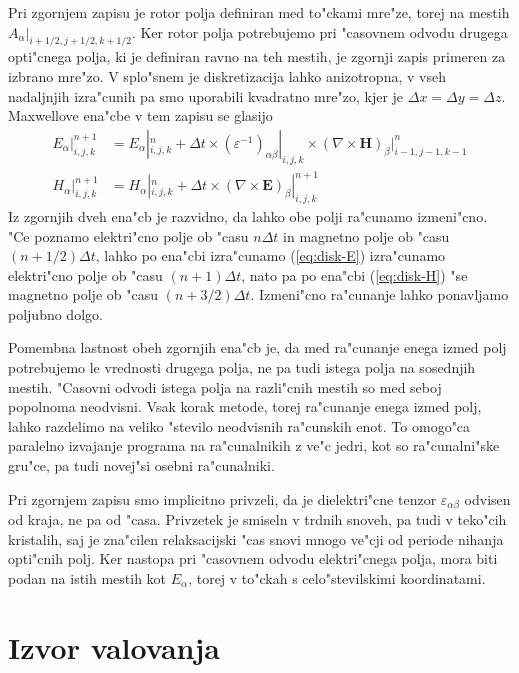 \documentclass[12pt,twoside,openright,final,a4paper]{report}
\renewcommand{\vec}{\mathbf}
\begin{document}
Pri zgornjem zapisu je rotor polja definiran med to"ckami mre"ze, torej na mestih $A_\alpha|_{i+1/2,j+1/2,k+1/2}$. 
Ker rotor polja potrebujemo pri "casovnem odvodu drugega opti"cnega polja, ki je definiran ravno na teh mestih, je zgornji zapis primeren za izbrano mre"zo. 
V splo"snem je diskretizacija lahko anizotropna, v vseh nadaljnjih izra"cunih pa smo uporabili kvadratno mre"zo, kjer je $\Delta x = \Delta y = \Delta z$. 
Maxwellove ena"cbe v tem zapisu se glasijo
\begin{align}
 E_\alpha|_{i,j,k}^{n+1} &= E_\alpha|_{i,j,k}^n + \Delta t \times (\varepsilon^{-1})_{\alpha\beta}|_{i,j,k} \times (\nabla\times \vec H)_\beta|_{i-1,j-1,k-1}^{n} \label{eq:disk-E}\\
 H_\alpha|_{i,j,k}^{n+1} &= H_\alpha|_{i,j,k}^n + \Delta t \times (\nabla\times \vec E)_\beta|_{i,j,k}^{n+1} \label{eq:disk-H}
\end{align}
Iz zgornjih dveh ena"cb je razvidno, da lahko obe polji ra"cunamo izmeni"cno. 
"Ce poznamo elektri"cno polje ob "casu $n\Delta t$ in magnetno polje ob "casu $(n+1/2)\Delta t$, lahko po ena"cbi izra"cunamo (\ref{eq:disk-E}) izra"cunamo elektri"cno polje ob "casu $(n+1)\Delta t$, nato pa po ena"cbi (\ref{eq:disk-H}) "se magnetno polje ob "casu $(n+3/2)\Delta t$. Izmeni"cno ra"cunanje lahko ponavljamo poljubno dolgo. 

Pomembna lastnost obeh zgornjih ena"cb je, da med ra"cunanje enega izmed polj potrebujemo le vrednosti drugega polja, ne pa tudi istega polja na sosednjih mestih. 
"Casovni odvodi istega polja na razli"cnih mestih so med seboj popolnoma neodvisni. 
Vsak korak metode, torej ra"cunanje enega izmed polj, lahko razdelimo na veliko "stevilo neodvisnih ra"cunskih enot. 
To omogo"ca paralelno izvajanje programa na ra"cunalnikih z ve"c jedri, kot so ra"cunalni"ske gru"ce, pa tudi novej"si osebni ra"cunalniki. 

Pri zgornjem zapisu smo implicitno privzeli, da je dielektri"cne tenzor $\varepsilon_{\alpha\beta}$ odvisen od kraja, ne pa od "casa. 
Privzetek je smiseln v trdnih snoveh, pa tudi v teko"cih kristalih, saj je zna"cilen relaksacijski "cas snovi mnogo ve"cji od periode nihanja opti"cnih polj. 
Ker nastopa pri "casovnem odvodu elektri"cnega polja, mora biti podan na istih mestih kot $E_\alpha$, torej v to"ckah s celo"stevilskimi koordinatami. 

\section{Izvor valovanja}
\end{document}
